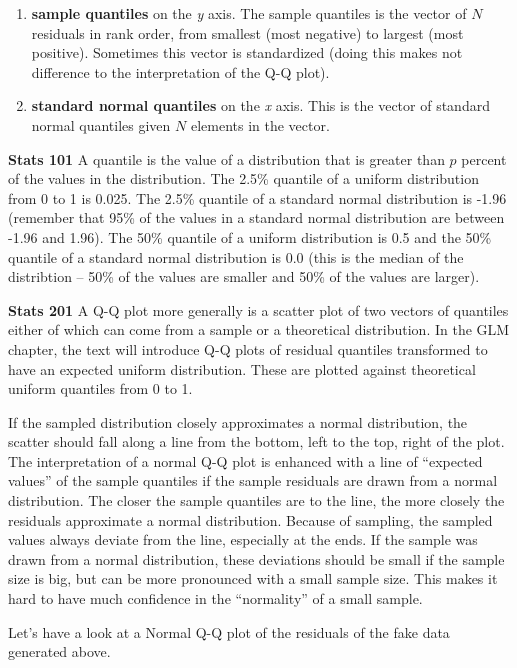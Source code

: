 \documentclass[]{book}
\providecommand{\tightlist}{%
  \setlength{\itemsep}{0pt}\setlength{\parskip}{0pt}}
\begin{document}
\begin{enumerate}
\def\labelenumi{\arabic{enumi}.}
\tightlist
\item
  \textbf{sample quantiles} on the \emph{y} axis. The sample quantiles is the vector of \(N\) residuals in rank order, from smallest (most negative) to largest (most positive). Sometimes this vector is standardized (doing this makes not difference to the interpretation of the Q-Q plot).
\item
  \textbf{standard normal quantiles} on the \emph{x} axis. This is the vector of standard normal quantiles given \(N\) elements in the vector.
\end{enumerate}

\textbf{Stats 101} A quantile is the value of a distribution that is greater than \(p\) percent of the values in the distribution. The 2.5\% quantile of a uniform distribution from 0 to 1 is 0.025. The 2.5\% quantile of a standard normal distribution is -1.96 (remember that 95\% of the values in a standard normal distribution are between -1.96 and 1.96). The 50\% quantile of a uniform distribution is 0.5 and the 50\% quantile of a standard normal distribution is 0.0 (this is the median of the distribtion -- 50\% of the values are smaller and 50\% of the values are larger).

\textbf{Stats 201} A Q-Q plot more generally is a scatter plot of two vectors of quantiles either of which can come from a sample or a theoretical distribution. In the GLM chapter, the text will introduce Q-Q plots of residual quantiles transformed to have an expected uniform distribution. These are plotted against theoretical uniform quantiles from 0 to 1.

If the sampled distribution closely approximates a normal distribution, the scatter should fall along a line from the bottom, left to the top, right of the plot. The interpretation of a normal Q-Q plot is enhanced with a line of ``expected values'' of the sample quantiles if the sample residuals are drawn from a normal distribution. The closer the sample quantiles are to the line, the more closely the residuals approximate a normal distribution. Because of sampling, the sampled values always deviate from the line, especially at the ends. If the sample was drawn from a normal distribution, these deviations should be small if the sample size is big, but can be more pronounced with a small sample size. This makes it hard to have much confidence in the ``normality'' of a small sample.

Let's have a look at a Normal Q-Q plot of the residuals of the fake data generated above.
\end{document}
